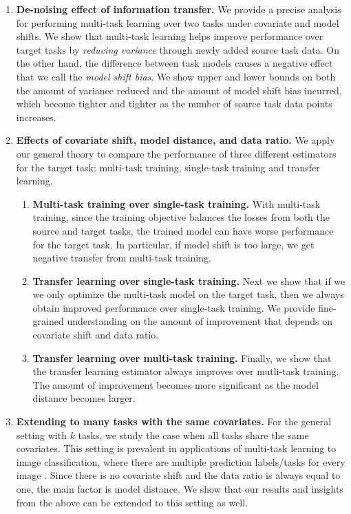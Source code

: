 \begin{enumerate}
	\item {\bf De-noising effect of information transfer.}
	We provide a precise analysis for performing multi-task learning over two tasks under covariate and model shifts.
	We show that multi-task learning helps improve performance over target tasks by \textit{reducing variance} through newly added source task data.
	On the other hand, the difference between task models causes a negative effect that we call the \textit{model shift bias}.
	We show upper and lower bounds on both the amount of variance reduced and the amount of model shift bias incurred, which become tighter and tighter as the number of source task data points increases.
	\item {\bf Effects of covariate shift, model distance, and data ratio.}
	We apply our general theory to compare the performance of three different estimators for the target task: multi-task training, single-task training and transfer learning.
	\begin{enumerate}
		\item {\bf Multi-task training over single-task training.} With multi-task training, since the training objective balances the losses from both the source and target tasks, the trained model can have worse performance for the target task.
	In particular, if model shift is too large, we get negative transfer from multi-task training.
		\item {\bf Transfer learning over single-task training.} Next we show that if we we only optimize the multi-task model on the target task, then we always obtain improved performance over single-task training.
		We provide fine-grained understanding on the amount of improvement that depends on covariate shift and data ratio.
		\item {\bf Transfer learning over multi-task training.} Finally, we show that the transfer learning estimator always improves over mutli-task training.
		The amount of improvement becomes more significant as the model distance becomes larger.
	\end{enumerate}
	\item {\bf Extending to many tasks with the same covariates.} For the general setting with $k$ tasks, we study the case when all tasks share the same covariates.
This setting is prevalent in applications of multi-task learning to image classification, where there are multiple prediction labels/tasks for every image \cite{EA20}.
	Since there is no covariate shift and the data ratio is always equal to one, the main factor is model distance.
	We show that our results and insights from the above can be extended to this setting as well.
\end{enumerate}



